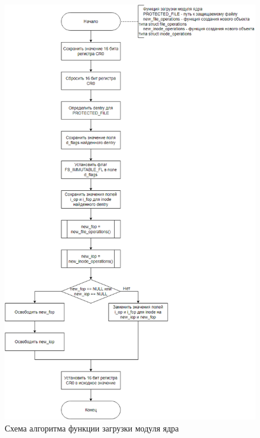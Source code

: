 \begin{figure}[h]
	\centering
	\captionsetup{justification=centering}
	\includegraphics[width=150mm]{img/module_init.png}
	\caption{Схема алгоритма функции загрузки модуля ядра}
	\label{fig:module-init}
\end{figure}

